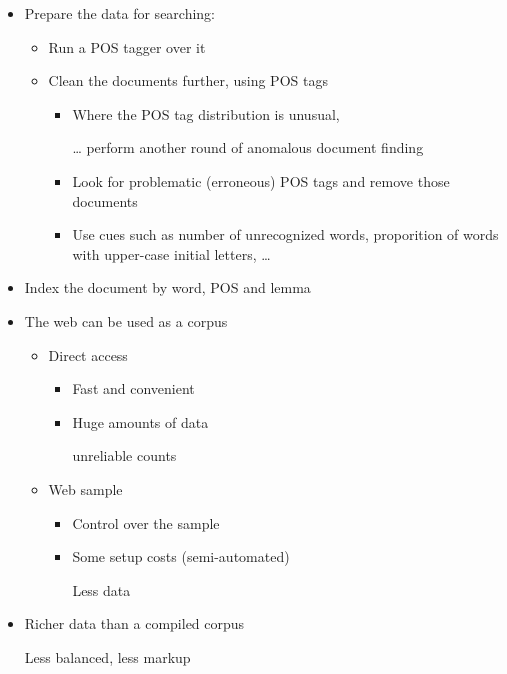 \documentclass[a4paper,landscape,headrule,footrule,xetex]{foils}
\begin{document}
\begin{itemize}
\item Prepare the  data  for searching:
  \begin{itemize}
  \item Run a POS tagger over it
  \item Clean the documents further, using POS tags
    \begin{itemize}
    \item Where the POS tag distribution is unusual,
    \item[\ldots] perform another round of anomalous document
finding
\item Look for problematic (erroneous) POS tags and
remove those documents
\item Use cues such as number of unrecognized words,
proporition of words with upper-case initial letters, \ldots
\end{itemize}
\end{itemize}
\item Index the document by word, POS and lemma
\end{itemize}


\MyLogo{}
 
\begin{itemize}
\item The web can be used as a corpus
  \begin{itemize}
  \item Direct access
    \begin{itemize}
    \item Fast and convenient
    \item Huge amounts of data
    \item[\Bad] unreliable counts 
    \end{itemize}
  \item Web sample
    \begin{itemize}
    \item Control over the sample
    \item Some setup costs (semi-automated)
    \item[\Bad] Less data 
    \end{itemize}
  \end{itemize}
\item Richer data than a compiled corpus
\item[\Bad] Less balanced, less markup
\end{itemize}
\end{document}
